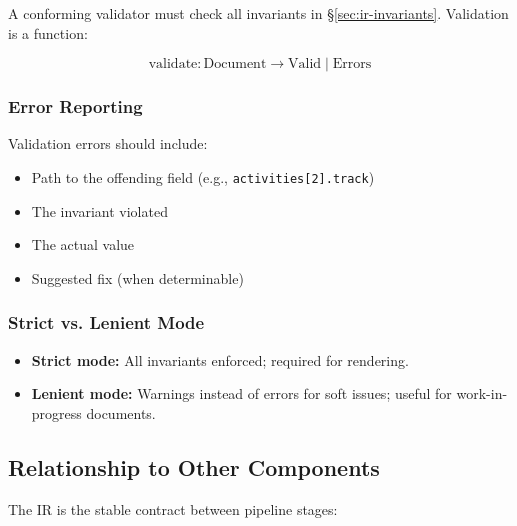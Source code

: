 A conforming validator must check all invariants in \S\ref{sec:ir-invariants}.
Validation is a function:

\[
\text{validate} : \text{Document} \to \text{Valid} \mid \text{Errors}
\]

\subsubsection{Error Reporting}

Validation errors should include:
\begin{itemize}
  \item Path to the offending field (e.g., \texttt{activities[2].track})
  \item The invariant violated
  \item The actual value
  \item Suggested fix (when determinable)
\end{itemize}

\subsubsection{Strict vs. Lenient Mode}

\begin{itemize}
  \item \textbf{Strict mode:} All invariants enforced; required for rendering.
  \item \textbf{Lenient mode:} Warnings instead of errors for soft issues; useful
        for work-in-progress documents.
\end{itemize}

\subsection{Relationship to Other Components}
\label{sec:ir-relationships}

The IR is the stable contract between pipeline stages:

